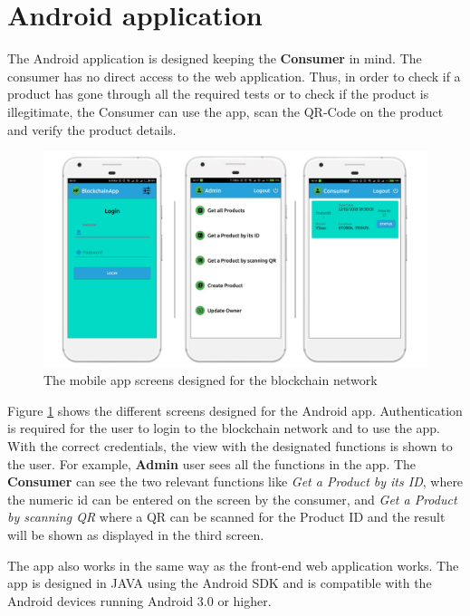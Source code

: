 \documentclass[
  a4paper,  %
  twoside,  %
  bibliography=totoc,
  headsepline,
  cleardoublepage=empty,
  parskip=half,
  draft=false
]{scrbook}
\begin{document}
\section{Android application}
The Android application is designed keeping the \textbf{Consumer} in mind. The consumer has no direct access to the web application. Thus, in order to check if a product has gone through all the required tests or to check if the product is illegitimate, the Consumer can use the app, scan the QR-Code on the product and verify the product details.
\begin{figure}[h!]
\begin{center}
\includegraphics[width=\textwidth]{graphics/app1.pdf}
\caption{The mobile app screens designed for the blockchain network}
\label{fig:app1}
\end{center}
\end{figure}

Figure \ref{fig:app1} shows the different screens designed for the Android app. Authentication is required for the user to login to the blockchain network and to use the app. With the correct credentials, the view with the designated functions is shown to the user. For example, \textbf{Admin} user sees all the functions in the app. The \textbf{Consumer} can see the two relevant functions like \textit{Get a Product by its ID}, where the numeric id can be entered on the screen by the consumer, and \textit{Get a Product by scanning QR} where a QR can be scanned for the Product ID and the result will be shown as displayed in the third screen.

The app also works in the same way as the front-end web application works. The app is designed in JAVA using the Android SDK and is compatible with the Android devices running Android 3.0 or higher. 
\end{document}
